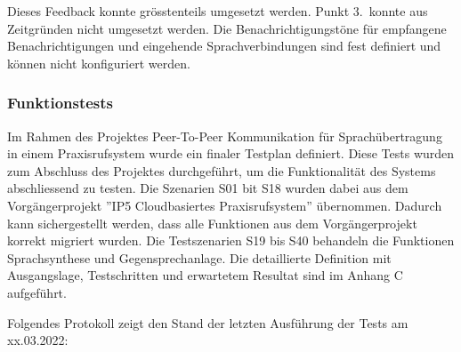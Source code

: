 Dieses Feedback konnte grösstenteils umgesetzt werden.
Punkt 3.\ konnte aus Zeitgründen nicht umgesetzt werden.
Die Benachrichtigungstöne für empfangene Benachrichtigungen und eingehende Sprachverbindungen sind fest definiert und können nicht konfiguriert werden.

\clearpage

\subsubsection{Funktionstests}

Im Rahmen des Projektes Peer-To-Peer Kommunikation für Sprachübertragung in einem Praxisrufsystem wurde ein finaler Testplan definiert.
Diese Tests wurden zum Abschluss des Projektes durchgeführt, um die Funktionalität des Systems abschliessend zu testen.
Die Szenarien S01 bit S18 wurden dabei aus dem Vorgängerprojekt ''IP5 Cloudbasiertes Praxisrufsystem'' übernommen.
Dadurch kann sichergestellt werden, dass alle Funktionen aus dem Vorgängerprojekt korrekt migriert wurden.
Die Testszenarien S19 bis S40 behandeln die Funktionen Sprachsynthese und Gegensprechanlage.
Die detaillierte Definition mit Ausgangslage, Testschritten und erwartetem Resultat sind im Anhang C aufgeführt.

Folgendes Protokoll zeigt den Stand der letzten Ausführung der Tests am xx.03.2022:

